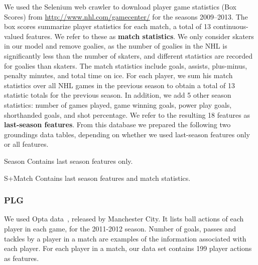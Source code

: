 \documentclass[conference]{IEEEtran}
\begin{document}
We used the Selenium web crawler \cite{bib:crawler} to download player game statistics (Box Scores) from \url{http://www.nhl.com/gamecenter/} for the seasons 2009--2013. The box scores summarize player statistics for each match, a total of 13 continuous-valued features. We refer to these as \textbf{match statistics}. We only consider skaters in our model and remove goalies, as the number of goalies in the NHL is significantly less than the number of skaters, and different statistics are recorded for goalies than skaters. The match statistics include goals, assists, plus-minus, penalty minutes, and total time on ice. For each player, we sum his match statistics over all NHL games in the previous season to obtain a total of 13 statistic totals for the previous season. In addition, we add 5 other season statistics: number of games played, game winning goals, power play goals, shorthanded goals, and shot percentage. We refer to the resulting 18 features as \textbf{last-season features}. From this database we prepared the following two groundings data tables, depending on whether we used last-season features only or all features.

\begin{LaTeXdescription}
\item[Season] Contains last season features only.
\item[S+Match] Contains last season features and match statistics.
\end{LaTeXdescription}



\subsubsection{PLG}
We used Opta data~\cite{bib:opta-original}, released by Manchester City. It lists ball actions of each player in each game, for the 2011-2012 season.
Number of goals, passes and tackles by a player in a match are examples of the information associated with each player.
For each player in a match, our data set contains 199 player actions as features.
\end{document}
